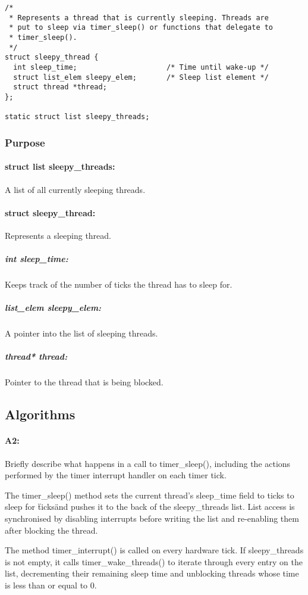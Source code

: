 \documentclass[11pt]{article}
\begin{document}
\begin{verbatim}
/*
 * Represents a thread that is currently sleeping. Threads are
 * put to sleep via timer_sleep() or functions that delegate to
 * timer_sleep().
 */
struct sleepy_thread {
  int sleep_time;                     /* Time until wake-up */
  struct list_elem sleepy_elem;       /* Sleep list element */
  struct thread *thread;
};

static struct list sleepy_threads;
\end{verbatim}

\subsubsection{Purpose}
\paragraph{struct list sleepy\_threads:}
A list of all currently sleeping threads.

\paragraph{struct sleepy\_thread:}
Represents a sleeping thread.

\subparagraph{int sleep\_time:}
Keeps track of the number of ticks the thread has to sleep for.
\subparagraph{list\_elem sleepy\_elem:}
A pointer into the list of sleeping threads.
\subparagraph{thread* thread:}
Pointer to the thread that is being blocked.

\subsection{Algorithms}
\paragraph{A2:}
Briefly describe what happens in a call to timer\_sleep(), including the actions
performed by the timer interrupt handler on each timer tick.

The timer\_sleep() method sets the current thread's sleep\_time field to ticks
to sleep for \"ticks\" and pushes it to the back of the sleepy\_threads
list. List access is synchronised by disabling interrupts before writing the
list and re-enabling them after blocking the thread.

The method timer\_interrupt() is called on every hardware tick. If
sleepy\_threads is not empty, it calls timer\_wake\_threads() to iterate through
every entry on the list, decrementing their remaining sleep time and unblocking
threads whose time is less than or equal to 0.
\end{document}
